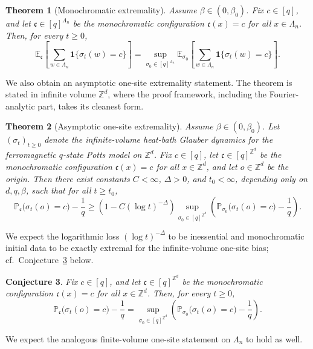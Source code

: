 \documentclass[letterpaper,11pt,reqno]{amsart}
\newtheorem{thm}{Theorem}[section]
\newtheorem{conj}[thm]{Conjecture}
\theoremstyle{definition}
\begin{document}
\begin{thm}[Monochromatic extremality]\label{thm:mono-extremal}
Assume \(\beta\in(0,\beta_0)\). Fix \(c\in[q]\), and let
\(\mathfrak c\in[q]^{\Lambda_n}\) be the monochromatic configuration
\(\mathfrak c(x)=c\) for all \(x\in\Lambda_n\). Then, for every \(t\ge0\),
\[
\mathbb E_{\mathfrak c}\!\left[\sum_{w\in\Lambda_n}\mathbf 1\{\sigma_t(w)=c\}\right]
=
\sup_{\sigma_0\in[q]^{\Lambda_n}}
\mathbb E_{\sigma_0}\!\left[\sum_{w\in\Lambda_n}\mathbf 1\{\sigma_t(w)=c\}\right].
\]
\end{thm}

We also obtain an asymptotic one-site extremality statement.
The theorem is stated in infinite volume $\mathbb Z^d$, where the proof framework, including the Fourier-analytic part, takes its cleanest form.

\begin{thm}[Asymptotic one-site extremality]\label{thm:worstini}
Assume \(\beta\in(0,\beta_0)\). Let \((\sigma_t)_{t\ge0}\) denote the infinite-volume heat-bath
Glauber dynamics for the ferromagnetic \(q\)-state Potts model on \(\mathbb Z^d\). Fix \(c\in[q]\),
let \(\mathfrak c\in[q]^{\mathbb Z^d}\) be the monochromatic configuration \(\mathfrak c(x)=c\) for
all \(x\in\mathbb Z^d\), and let \(o\in\mathbb Z^d\) be the origin. Then there exist constants
\(C<\infty\), \(\Delta>0\), and \(t_0<\infty\), depending only on \(d,q,\beta\), such that for all
\(t\ge t_0\),
\[
\mathbb P_{\mathfrak c}\bigl(\sigma_t(o)=c\bigr)-\frac1q
\ge
\left(1-C(\log t)^{-\Delta}\right)
\sup_{\sigma_0\in[q]^{\mathbb Z^d}}
\left(
\mathbb P_{\sigma_0}\bigl(\sigma_t(o)=c\bigr)-\frac1q
\right).
\]
\end{thm}

We expect the logarithmic loss \((\log t)^{-\Delta}\) to be inessential and monochromatic initial data to be exactly extremal for the infinite-volume one-site bias; cf.\
Conjecture~\ref{conj:one-site-exact} below.


\begin{conj}\label{conj:one-site-exact}
Fix \(c\in[q]\), and let \(\mathfrak c\in[q]^{\mathbb Z^d}\) be the monochromatic configuration
\(\mathfrak c(x)=c\) for all \(x\in\mathbb Z^d\). Then, for every \(t\ge0\),
\[
\mathbb P_{\mathfrak c}\bigl(\sigma_t(o)=c\bigr)-\frac1q
=
\sup_{\sigma_0\in[q]^{\mathbb Z^d}}
\left(
\mathbb P_{\sigma_0}\bigl(\sigma_t(o)=c\bigr)-\frac1q
\right).
\]
\end{conj}

We expect the analogous finite-volume one-site statement on \(\Lambda_n\) to hold as well.
\end{document}
